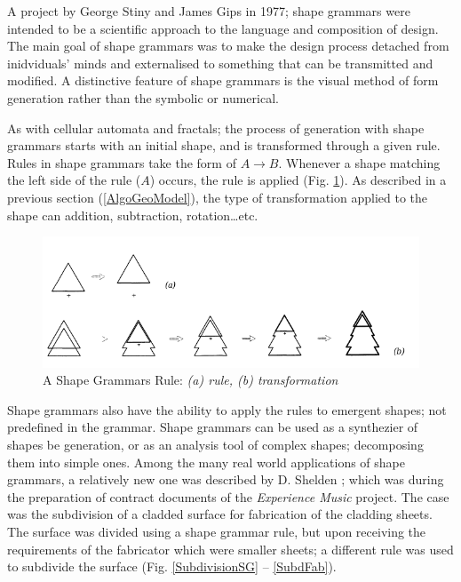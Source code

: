 A project by George Stiny and James Gips in 1977; shape grammars were intended to be a scientific approach to the language and composition of design. The main goal of shape grammars was to make the design process detached from inidviduals' minds and externalised to something that can be transmitted and modified. A distinctive feature of shape grammars is the visual method of form generation rather than the symbolic or numerical.

As with cellular automata and fractals; the process of generation with shape grammars starts with an initial shape, and is transformed through a given rule. Rules in shape grammars take the form of $A \rightarrow B$. Whenever a shape matching the left side of the rule ($A$) occurs, the rule is applied (Fig. \ref{ShapeGrammarsRule}). As described in a previous section (\ref{AlgoGeoModel}), the type of transformation applied to the shape can addition, subtraction, rotation\ldots etc. 

\begin{figure}[htbp]
\centering
\includegraphics[width=\textwidth]{./Images/12-ShapeGrammarsRule}
\caption[Shape Grammars Rule]{A Shape Grammars Rule: \emph{(a) rule, (b) transformation} \cite{arida04}}
\label{ShapeGrammarsRule}
\end{figure}

Shape grammars also have the ability to apply the rules to emergent shapes; not predefined in the grammar. Shape grammars can be used as a synthezier of shapes be generation, or as an analysis tool of complex shapes; decomposing them into simple ones. Among the many real world applications of shape grammars, a relatively new one was described by D. Shelden \cite{shelden02}; which was during the preparation of contract documents of the \emph{Experience Music} project. The case was the subdivision of a cladded surface for fabrication of the cladding sheets. The surface was divided using a shape grammar rule, but upon receiving the requirements of the fabricator which were smaller sheets; a different rule was used to subdivide the surface (Fig. \ref{SubdivisionSG} -- \ref{SubdFab}).

